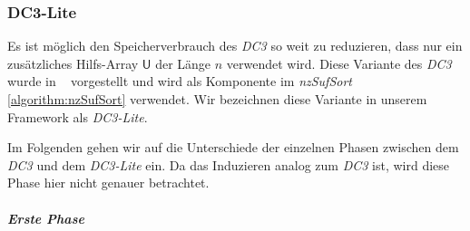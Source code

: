 \subsubsection{DC3-Lite}
\label{dc3:lite}


Es  ist möglich den Speicherverbrauch des \emph{DC3} so weit zu reduzieren, dass nur ein zusätzliches Hilfs-Array $\mathsf{U}$ der Länge $n$ verwendet wird. Diese Variante des \emph{DC3} wurde in ~\cite{saca:10} vorgestellt und wird als Komponente im \emph{nzSufSort} \cref{algorithm:nzSufSort} verwendet. Wir bezeichnen diese Variante in unserem Framework als \emph{DC3-Lite}. \par
Im Folgenden gehen wir auf die Unterschiede der einzelnen Phasen zwischen dem \emph{DC3} und dem \emph{DC3-Lite} ein. Da das Induzieren analog zum \emph{DC3} ist, wird diese Phase hier nicht genauer betrachtet. 

\subparagraph*{Erste Phase}

